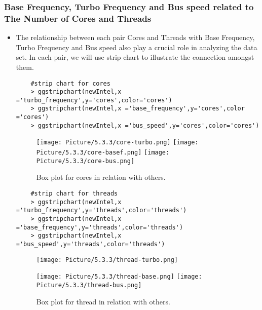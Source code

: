 \documentclass[a4paper]{article}
\begin{document}
\subsubsection{Base Frequency, Turbo Frequency and Bus speed related to The Number of Cores and Threads}
\begin{itemize}
    \item [] The relationship between each pair Cores and Threads with Base Frequency, Turbo Frequency and Bus speed also play a crucial role in analyzing the data set. In each pair, we will use strip chart to illustrate the connection amongst them.
    \begin{lstlisting}
    #strip chart for cores
    > ggstripchart(newIntel,x ='turbo_frequency',y='cores',color='cores')
    > ggstripchart(newIntel,x ='base_frequency',y='cores',color ='cores')
    > ggstripchart(newIntel,x ='bus_speed',y='cores',color='cores')
    \end{lstlisting}
    \begin{figure}[H]
        \centering
        \texttt{[image: Picture/5.3.3/core-turbo.png]}
        \texttt{[image: Picture/5.3.3/core-basef.png]}
        \texttt{[image: Picture/5.3.3/core-bus.png]}
        \caption{Box plot for cores in relation with others.}
    \end{figure}
    \begin{lstlisting}
    #strip chart for threads
    > ggstripchart(newIntel,x ='turbo_frequency',y='threads',color='threads')
    > ggstripchart(newIntel,x ='base_frequency',y='threads',color='threads')
    > ggstripchart(newIntel,x ='bus_speed',y='threads',color='threads')
    \end{lstlisting}
    
    \begin{figure}[H]
        \centering
        \texttt{[image: Picture/5.3.3/thread-turbo.png]}
    \end{figure}
    
    \begin{figure}[H]
        \centering
        \texttt{[image: Picture/5.3.3/thread-base.png]}
        \texttt{[image: Picture/5.3.3/thread-bus.png]}
        \caption{Box plot for thread in relation with others.}
    \end{figure}
\end{itemize}

 
\end{document}
